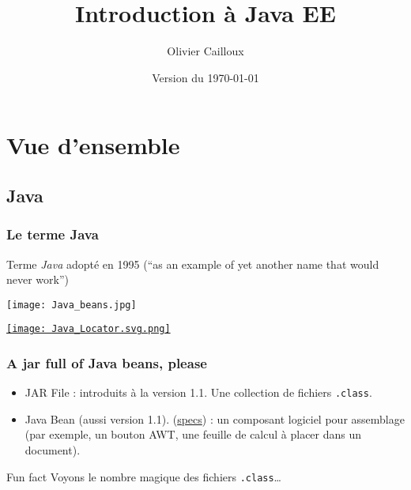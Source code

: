 \documentclass[english, french]{beamer}
\title{Introduction à Java EE}
\author{Olivier Cailloux}
\institute[LAMSADE]{LAMSADE, Université Paris-Dauphine}
\date{Version du \today}
\begin{document}


\begin{frame}[plain]
   \titlepage
\end{frame}
\addtocounter{framenumber}{-1}

\section{Vue d’ensemble}
\subsection{Java}
\begin{frame}[fragile]
	\frametitle{Le terme Java}
	
	Terme \emph{Java} adopté en 1995 (“as an example of yet another name that would never work”) 
	\hfill
	\vfill
	\begin{minipage}[b]{3cm}
		\texttt{[image: Java\_beans.jpg]}
	\end{minipage}%
	\begin{minipage}[b]{(\columnwidth - 3cm)}
		\pause
		\href{https://en.wikipedia.org/wiki/Java}{\texttt{[image: Java\_Locator.svg.png]}}
	\end{minipage}
\end{frame}

\begin{frame}
	\frametitle{A jar full of Java beans, please}
	\begin{itemize}
		\item JAR File : introduits à la version 1.1. Une collection de fichiers \texttt{.class}.
		\item Java Bean (aussi version 1.1). (\href{http://www.oracle.com/technetwork/java/javase/documentation/spec-136004.html}{specs}) : un composant logiciel pour assemblage (par exemple, un bouton AWT, une feuille de calcul à placer dans un document).
	\end{itemize}
	\begin{block}{Fun fact}
		Voyons le nombre magique des fichiers \texttt{.class}…
	\end{block}
\end{frame}
\end{document}
